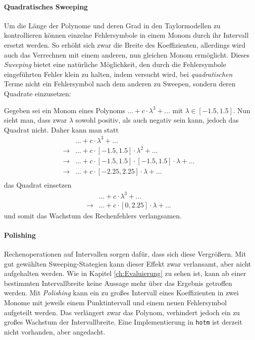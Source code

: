 \paragraph{Quadratisches Sweeping}
Um die Länge der Polynome und deren Grad in den Taylormodellen zu kontrollieren können einzelne 
Fehlersymbole in einem Monom durch ihr Intervall ersetzt werden. So erhöht sich zwar die Breite des 
Koeffizienten, allerdings wird auch das Verrechnen mit einem anderen, nun gleichen Monom 
ermöglicht. Dieses \textit{Sweeping} bietet eine natürliche Möglichkeit, den durch die 
Fehlersymbole eingeführten Fehler klein zu halten, indem versucht wird, bei
\textit{quadratischen} Terme nicht ein Fehlersymbol nach dem anderen zu Sweepen, sondern deren 
Quadrate einzusetzen: \par
Gegeben sei ein Monom eines Polynoms $...+ c \cdot \lambda^3 + ...$ mit $\lambda \in [-1.5, 1.5]$. Nun sieht man, dass zwar $\lambda$ sowohl positiv, als auch negativ sein kann, jedoch das Quadrat nicht. Daher kann man statt
\begin{align*}
    & ... + c \cdot \lambda^3 + ... \\
    \rightarrow & ...+ c \cdot [-1.5, 1.5] \cdot \lambda^2  +... \\
    \rightarrow & ...+ c \cdot [-1.5, 1.5] \cdot [-1.5, 1.5] \cdot \lambda +... \\
    \rightarrow & ...+ c \cdot [-2.25, 2.25] \cdot \lambda+... \\
\end{align*}
das Quadrat einsetzen
\begin{align*}
    & ... + c \cdot \lambda^3 + ... \\
    \rightarrow & ...+ c \cdot [0, 2.25] \cdot \lambda +...
\end{align*}
und somit das Wachstum des Rechenfehlers verlangsamen. 
\paragraph{Polishing}
Rechenoperationen auf Intervallen sorgen dafür, dass sich diese Vergrößern. Mit gut gewählten Sweeping-Stategien kann dieser Effekt zwar verlansamt, aber nicht aufgehalten werden. Wie in Kapitel \ref{ch:Evaluierung} zu sehen ist, kann ab einer bestimmten Intervallbreite keine 
Aussage mehr über das Ergebnis getroffen werden. Mit \textit{Polishing} \cite{DBLP:conf/macis/BrausseKM15} kann ein zu großes Intervall eines Koeffizienten in zwei Monome mit jeweils einem Punktintervall und einem neuen Fehlersymbol aufgeteilt werden. Das verlängert zwar das Polynom, verhindert jedoch ein zu großes Wachstum der Intervallbreite. Eine Implementierung in \verb+hotm+ ist  derzeit nicht vorhanden, aber angedacht.


